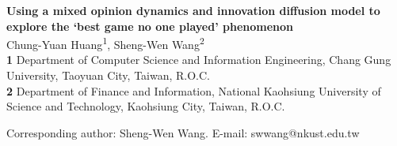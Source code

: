 \documentclass[10pt,letterpaper]{article}
\begin{document}
\vspace*{0.2in}

\begin{flushleft}
{\Large
\textbf{Using a mixed opinion dynamics and innovation diffusion model to explore the `best game no one played' phenomenon}
}
\newline
\\
Chung-Yuan Huang\textsuperscript{1},
Sheng-Wen Wang\textsuperscript{2}
\\
\bigskip
\textbf{1} Department of Computer Science and Information Engineering, Chang Gung University, Taoyuan City, Taiwan, R.O.C.
\\
\textbf{2} Department of Finance and Information, National Kaohsiung University of Science and Technology, Kaohsiung City, Taiwan, R.O.C.
\\
\bigskip

Corresponding author: Sheng-Wen Wang. E-mail: swwang@nkust.edu.tw

\end{flushleft}

\end{document}

